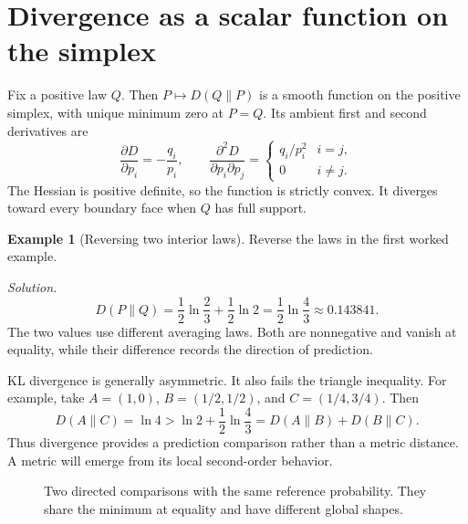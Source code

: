 \documentclass[11pt,oneside,openany]{book}
\theoremstyle{definition}
\newtheorem{example}{Example}[chapter]
\theoremstyle{remark}
\newenvironment{solution}{\par\smallskip\noindent\textit{Solution.}\ }{\par\smallskip}
\numberwithin{equation}{chapter}
\begin{document}
\section{Divergence as a scalar function on the simplex}
Fix a positive law $Q$. Then $P\mapsto D(Q\|P)$ is a smooth function on the positive simplex, with unique minimum zero at $P=Q$. Its ambient first and second derivatives are
\[
\frac{\partial D}{\partial p_i}=-\frac{q_i}{p_i},\qquad
\frac{\partial^2D}{\partial p_i\partial p_j}
=\begin{cases}q_i/p_i^2&i=j,\\0&i\ne j.\end{cases}
\]
The Hessian is positive definite, so the function is strictly convex. It diverges toward every boundary face when $Q$ has full support.

\begin{example}[Reversing two interior laws]
Reverse the laws in the first worked example.
\begin{solution}
\[
D(P\|Q)=\frac12\ln\frac{2}{3}+\frac12\ln2
=\frac12\ln\frac43\approx0.143841.
\]
The two values use different averaging laws. Both are nonnegative and vanish at equality, while their difference records the direction of prediction.
\end{solution}
\end{example}

KL divergence is generally asymmetric. It also fails the triangle inequality. For example, take $A=(1,0)$, $B=(1/2,1/2)$, and $C=(1/4,3/4)$. Then
\[
D(A\|C)=\ln4>\ln2+\frac12\ln\frac43
=D(A\|B)+D(B\|C).
\]
Thus divergence provides a prediction comparison rather than a metric distance. A metric will emerge from its local second-order behavior.

\begin{figure}[htbp]
\centering
{}
\caption{Two directed comparisons with the same reference probability. They share the minimum at equality and have different global shapes.}
\end{figure}
\end{document}
